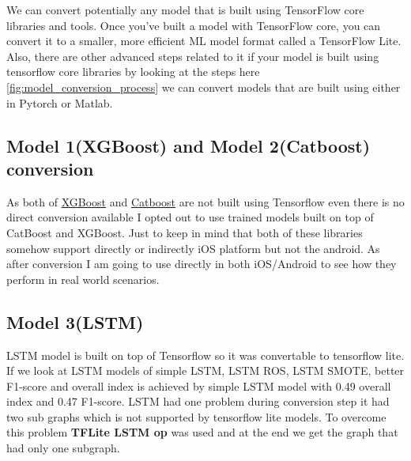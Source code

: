  We can convert potentially any model that is built using TensorFlow core libraries and tools. Once you've built a model with TensorFlow core, you can convert it to a smaller, more efficient ML model format called a TensorFlow Lite. Also, there are other advanced steps related to it if your model is built using tensorflow core libraries by looking at the steps here  \ref{fig:model_conversion_process} we can convert models that are built using either in Pytorch or Matlab. 
 
 
\subsection{Model 1(XGBoost) and Model 2(Catboost) conversion}\label{5CTLM1M2}

As both of \href{https://xgboost.readthedocs.io}{XGBoost} and \href{https://catboost.ai}{Catboost} are not built using Tensorflow even there is no direct conversion available I opted out to use trained models built on top of CatBoost and XGBoost. Just to keep in mind that both of these libraries somehow support directly or indirectly iOS platform but not the android. As after conversion I am going to use directly in both iOS/Android to see how they perform in real world scenarios. 

\subsection{Model 3(LSTM)}\label{5CTLM3}

LSTM model is built on top of Tensorflow so it was convertable to tensorflow lite. If we look at LSTM models of simple LSTM, LSTM ROS, LSTM SMOTE, better F1-score and overall index is achieved by simple LSTM model with 0.49 overall index and 0.47 F1-score. LSTM had one problem during conversion step it had two sub graphs which is not supported by tensorflow lite models. To overcome this problem \textbf{TFLite LSTM op } was used and at the end we get the graph that had only one subgraph.


